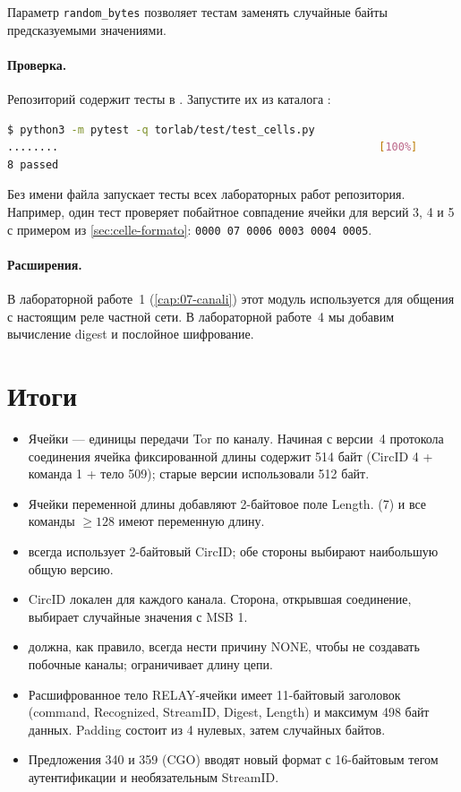 Параметр \texttt{random\_bytes} позволяет тестам заменять случайные байты предсказуемыми значениями.

\paragraph{Проверка.} Репозиторий содержит тесты в . Запустите их из каталога :
\begin{lstlisting}[language=bash,numbers=none]
$ python3 -m pytest -q torlab/test/test_cells.py
........                                                  [100%]
8 passed
\end{lstlisting}
Без имени файла  запускает тесты всех лабораторных работ репозитория.
Например, один тест проверяет побайтное совпадение ячейки  для версий 3, 4 и 5 с примером из \cref{sec:celle-formato}: \texttt{0000 07 0006 0003 0004 0005}.

\paragraph{Расширения.} В лабораторной работе~1 (\cref{cap:07-canali}) этот модуль используется для общения с настоящим реле частной сети. В лабораторной работе~4 мы добавим вычисление digest и послойное шифрование.

\section*{Итоги}
\begin{itemize}
  \item Ячейки --- единицы передачи Tor по каналу. Начиная с версии~4 протокола соединения ячейка фиксированной длины содержит 514 байт (CircID 4 + команда 1 + тело 509); старые версии использовали 512 байт.
  \item Ячейки переменной длины добавляют 2-байтовое поле Length.  (7) и все команды $\ge 128$ имеют переменную длину.
  \item {} всегда использует 2-байтовый CircID; обе стороны выбирают наибольшую общую версию.
  \item CircID локален для каждого канала. Сторона, открывшая соединение, выбирает случайные значения с MSB 1.
  \item {} должна, как правило, всегда нести причину NONE, чтобы не создавать побочные каналы;  ограничивает длину цепи.
  \item Расшифрованное тело RELAY-ячейки имеет 11-байтовый заголовок (command, Recognized, StreamID, Digest, Length) и максимум 498 байт данных. Padding состоит из 4 нулевых, затем случайных байтов.
  \item Предложения 340 и 359 (CGO) вводят новый формат с 16-байтовым тегом аутентификации и необязательным StreamID.
\end{itemize}

